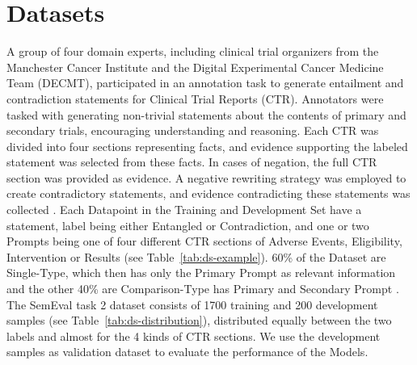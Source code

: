 \section{Datasets}\label{sec:dataset}

A group of four domain experts, including clinical trial organizers from the Manchester Cancer Institute and the 
Digital Experimental Cancer Medicine Team (DECMT), participated in an annotation task to generate entailment and contradiction 
statements for Clinical Trial Reports (CTR). Annotators were tasked with generating non-trivial statements about the contents of primary and 
secondary trials, encouraging understanding and reasoning. Each CTR was divided into four sections representing facts, and 
evidence supporting the labeled statement was selected from these facts. In cases of negation, the full CTR section was 
provided as evidence. A negative rewriting strategy was employed to create contradictory statements, and evidence contradicting 
these statements was collected \cite{jullien_semeval-2023_nodate} \cite{noauthor_nli4ct_nodate}.
Each Datapoint in the Training and Development Set have a statement, label being either Entangled or Contradiction, and one or two Prompts being
one of four different CTR sections of Adverse Events, Eligibility, Intervention or Results (see Table~\ref{tab:ds-example}). 
60\% of the Dataset are Single-Type, which then has only the Primary Prompt as relevant information and the other 40\% are 
Comparison-Type has Primary and Secondary Prompt \cite{noauthor_nli4ct_nodate}\cite{jullien_nli4ct_2023}\cite{jullien_semeval-2023_nodate}.
The SemEval task 2 dataset consists of 1700 training and 200 development samples (see Table~\ref{tab:ds-distribution}),
distributed equally between the two labels and almost for the 4 kinds of CTR sections. We use the development samples
as validation dataset to evaluate the performance of the Models.


